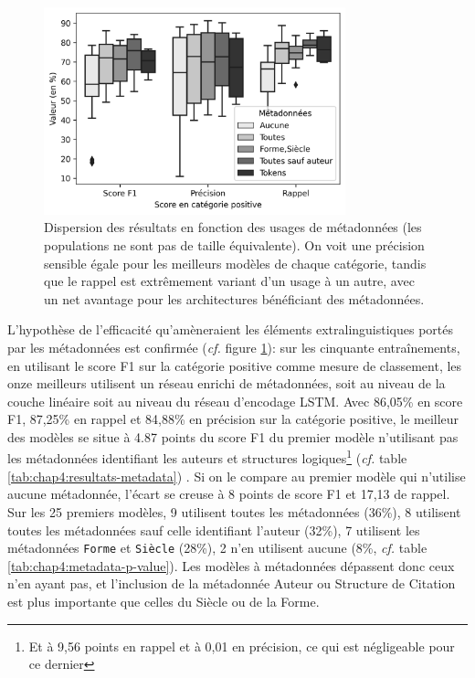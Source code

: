 \begin{figure}[ht]
    \centering
    \includegraphics[height=6cm]{figures/chap4/scoreMetadata.png}
    \caption{Dispersion des résultats en fonction des usages de métadonnées (les populations ne sont pas de taille équivalente). On voit une précision sensible égale pour les meilleurs modèles de chaque catégorie, tandis que le rappel est extrêmement variant d'un usage à un autre, avec un net avantage pour les architectures bénéficiant des métadonnées.}
    \label{fig:chap4:metadata-boxplot}
\end{figure}

L'hypothèse de l'efficacité qu'amèneraient les éléments extralinguistiques portés par les métadonnées est confirmée (\textit{cf.} figure \ref{fig:chap4:metadata-boxplot}): sur les cinquante entraînements, en utilisant le score F1 sur la catégorie positive comme mesure de classement, les onze meilleurs utilisent un réseau enrichi de métadonnées, soit au niveau de la couche linéaire soit au niveau du réseau d'encodage LSTM. Avec 86,05\% en score F1, 87,25\% en rappel et 84,88\% en précision sur la catégorie positive, le meilleur des modèles se situe à 4.87 points du score F1 du premier modèle n'utilisant pas les métadonnées identifiant les auteurs et structures logiques\footnote{Et à 9,56 points en rappel et à 0,01 en précision, ce qui est négligeable pour ce dernier} (\textit{cf.} table \ref{tab:chap4:resultats-metadata}) . Si on le compare au premier modèle qui n'utilise aucune métadonnée, l'écart se creuse à 8 points de score F1 et 17,13 de rappel. Sur les 25 premiers modèles, 9 utilisent toutes les métadonnées (36\%), 8 utilisent toutes les métadonnées sauf celle identifiant l'auteur (32\%), 7 utilisent les métadonnées \texttt{Forme} et \texttt{Siècle} (28\%), 2 n'en utilisent aucune (8\%, \textit{cf.} table \ref{tab:chap4:metadata-p-value}). Les modèles à métadonnées dépassent donc ceux n'en ayant pas, et l'inclusion de la métadonnée Auteur ou Structure de Citation est plus importante que celles du Siècle ou de la Forme.


